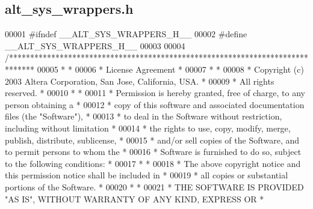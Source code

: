 \subsection{alt\+\_\+sys\+\_\+wrappers.\+h}
\label{alt__sys__wrappers_8h_source}

\begin{DoxyCode}
00001 \textcolor{preprocessor}{#ifndef \_\_ALT\_SYS\_WRAPPERS\_H\_\_}
00002 \textcolor{preprocessor}{#define \_\_ALT\_SYS\_WRAPPERS\_H\_\_}
00003 
00004 \textcolor{comment}{/******************************************************************************}
00005 \textcolor{comment}{*                                                                             *}
00006 \textcolor{comment}{* License Agreement                                                           *}
00007 \textcolor{comment}{*                                                                             *}
00008 \textcolor{comment}{* Copyright (c) 2003 Altera Corporation, San Jose, California, USA.           *}
00009 \textcolor{comment}{* All rights reserved.                                                        *}
00010 \textcolor{comment}{*                                                                             *}
00011 \textcolor{comment}{* Permission is hereby granted, free of charge, to any person obtaining a     *}
00012 \textcolor{comment}{* copy of this software and associated documentation files (the "Software"),  *}
00013 \textcolor{comment}{* to deal in the Software without restriction, including without limitation   *}
00014 \textcolor{comment}{* the rights to use, copy, modify, merge, publish, distribute, sublicense,    *}
00015 \textcolor{comment}{* and/or sell copies of the Software, and to permit persons to whom the       *}
00016 \textcolor{comment}{* Software is furnished to do so, subject to the following conditions:        *}
00017 \textcolor{comment}{*                                                                             *}
00018 \textcolor{comment}{* The above copyright notice and this permission notice shall be included in  *}
00019 \textcolor{comment}{* all copies or substantial portions of the Software.                         *}
00020 \textcolor{comment}{*                                                                             *}
00021 \textcolor{comment}{* THE SOFTWARE IS PROVIDED "AS IS", WITHOUT WARRANTY OF ANY KIND, EXPRESS OR  *}

\end{DoxyCode}
